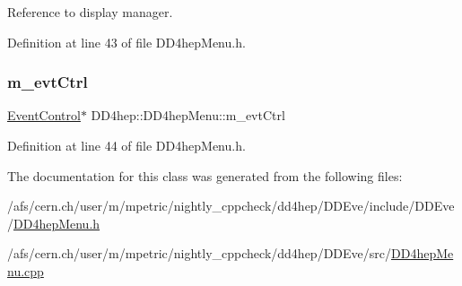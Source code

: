 Reference to display manager. 



Definition at line 43 of file D\+D4hep\+Menu.\+h.

\hypertarget{class_d_d4hep_1_1_d_d4hep_menu_a3c5139077c3f664d0ab0bcde163466f6}{}\label{class_d_d4hep_1_1_d_d4hep_menu_a3c5139077c3f664d0ab0bcde163466f6} 
\subsubsection{\texorpdfstring{m\+\_\+evt\+Ctrl}{m\_evtCtrl}}
{\footnotesize\ttfamily \hyperlink{class_d_d4hep_1_1_event_control}{Event\+Control}$\ast$ D\+D4hep\+::\+D\+D4hep\+Menu\+::m\+\_\+evt\+Ctrl\hspace{0.3cm}{\ttfamily [protected]}}



Definition at line 44 of file D\+D4hep\+Menu.\+h.



The documentation for this class was generated from the following files\+:\begin{DoxyCompactItemize}
\item 
/afs/cern.\+ch/user/m/mpetric/nightly\+\_\+cppcheck/dd4hep/\+D\+D\+Eve/include/\+D\+D\+Eve/\hyperlink{_d_d4hep_menu_8h}{D\+D4hep\+Menu.\+h}\item 
/afs/cern.\+ch/user/m/mpetric/nightly\+\_\+cppcheck/dd4hep/\+D\+D\+Eve/src/\hyperlink{_d_d4hep_menu_8cpp}{D\+D4hep\+Menu.\+cpp}\end{DoxyCompactItemize}
